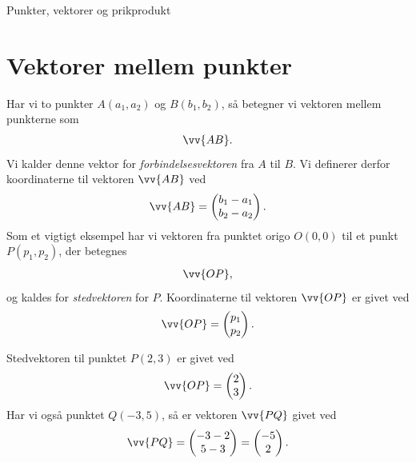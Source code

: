\begin{center}
\Huge
Punkter, vektorer og prikprodukt
\end{center}

\section*{Vektorer mellem punkter}
Har vi to punkter $A(a_1,a_2)$ og $B(b_1,b_2)$, så betegner vi vektoren mellem punkterne som
\begin{align*}
\vv{AB}.
\end{align*}
Vi kalder denne vektor for \textit{forbindelsesvektoren} fra $A$ til $B$.
Vi definerer derfor koordinaterne til vektoren $\vv{AB}$ ved 
\begin{align*}
	\vv{AB} = 
	\begin{pmatrix}
		b_1 - a_1\\b_2-a_2
	\end{pmatrix}.
\end{align*}
Som et vigtigt eksempel har vi vektoren fra punktet origo $O(0,0)$ til et punkt $P(p_1,p_2)$, der betegnes 
\begin{align*}
\vv{OP},
\end{align*}
og kaldes for \textit{stedvektoren} for $P$. 
Koordinaterne til vektoren $\vv{OP}$ er givet ved 
\begin{align*}
	\vv{OP} = 
	\begin{pmatrix}
		p_1\\p_2
	\end{pmatrix}.
\end{align*}
\begin{exa}
Stedvektoren til punktet $P(2,3)$ er givet ved 
\begin{align*}
	\vv{OP} = 
	\begin{pmatrix}
		2\\3
	\end{pmatrix}.
\end{align*}
Har vi også punktet $Q(-3,5)$, så er vektoren $\vv{PQ}$ givet ved
\begin{align*}
	\vv{PQ} =
	\begin{pmatrix}
		-3-2\\
		5-3
	\end{pmatrix} =
	\begin{pmatrix}
		-5\\2
	\end{pmatrix}.
\end{align*}
\end{exa}

